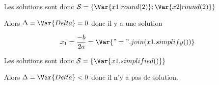 \documentclass[a4paper,10pt]{article}
\begin{document}
    Les solutions sont donc $\mathcal{S} = \left\{ \Var{x1|round(2)}; \Var{x2|round(2)} \right\}$

    Alors $\Delta = \Var{Delta} = 0$ donc il y a une solution


    \begin{eqnarray*}
        x_1 = \frac{-b}{2a} = \Var{" = ".join(x1.simplify())}
    \end{eqnarray*}

    Les solutions sont donc $\mathcal{S} = \left\{ \Var{x1.simplified()}\right\}$

    Alors $\Delta = \Var{Delta} < 0$ donc il n'y a pas de solution.

\end{document}
